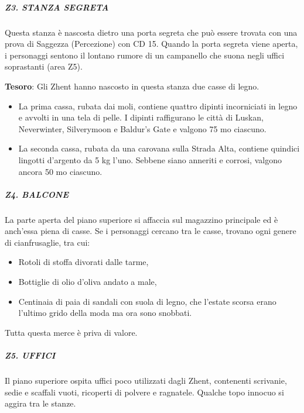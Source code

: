 \documentclass{article}
\begin{document}
                        \subparagraph{Z3. STANZA SEGRETA}
                        Questa stanza è nascosta dietro una porta segreta che può essere trovata con una prova di Saggezza (Percezione) con CD 15. Quando la porta segreta viene aperta, i personaggi sentono il lontano rumore di un campanello che suona negli uffici soprastanti (area Z5).

                        \textbf{Tesoro}: Gli Zhent hanno nascosto in questa stanza due casse di legno.
                        
                        \begin{itemize}
                            \item La prima cassa, rubata dai moli, contiene quattro dipinti incorniciati in legno e avvolti in una tela di pelle. I dipinti raffigurano le città di Luskan, Neverwinter, Silverymoon e Baldur's Gate e valgono 75 mo ciascuno.
                            \item La seconda cassa, rubata da una carovana sulla Strada Alta, contiene quindici lingotti d'argento da 5 kg l'uno. Sebbene siano anneriti e corrosi, valgono ancora 50 mo ciascuno.
                        \end{itemize}
                        


                        \subparagraph{Z4. BALCONE}
                        La parte aperta del piano superiore si affaccia sul magazzino principale ed è anch'essa piena di casse. Se i personaggi cercano tra le casse, trovano ogni genere di cianfrusaglie, tra cui:

                        \begin{itemize}
                            \item Rotoli di stoffa divorati dalle tarme,
                            \item Bottiglie di olio d'oliva andato a male,
                            \item Centinaia di paia di sandali con suola di legno, che l'estate scorsa erano l'ultimo grido della moda ma ora sono snobbati.
                        \end{itemize}
                        
                        Tutta questa merce è priva di valore.
                        


                        \subparagraph{Z5. UFFICI}
Il piano superiore ospita uffici poco utilizzati dagli Zhent, contenenti scrivanie, sedie e scaffali vuoti, ricoperti di polvere e ragnatele. Qualche topo innocuo si aggira tra le stanze. 
\end{document}
